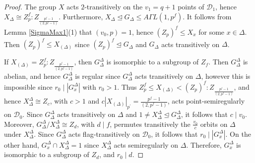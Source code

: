 \documentclass[10pt,a4paper]{amsart}
\renewcommand{\leq}{\leqslant}
\begin{document}
\begin{proof}
The group $X$ acts $2$-transitively on the $v_{1}=q+1$ points of $\mathcal{D}_{1}$, hence $X_{\Delta }\cong Z^{f}_{p}:Z_{\frac{p^{f}-1}{(2,p^{f}-1)}}$. Furthermore, $X_{\Delta }\trianglelefteq G_{\Delta }\leq A\Gamma L(1,p^{f})$. It follows from Lemma \ref{SigmaMax1}(1) that $(v_{0},p)=1$, hence $(Z_{p})^{f}\leq X_{x}$ for some $x\in \Delta $. Then $(Z_{p})^{f}\leq X_{(\Delta )}$ since $(Z_{p})^{f}\trianglelefteq G_{\Delta }$ and $G_{\Delta }$ acts
transitively on $\Delta $.

If $X_{(\Delta )}=Z_{p}^{f}:Z_{\frac{p^{f}-1}{(2,p^{f}-1)}}$, then $%
G_{\Delta }^{\Delta }$ is isomorphic to a subgroup of $Z_{f}$. Then $%
G_{\Delta }^{\Delta }$ is abelian, and hence $G_{\Delta }^{\Delta }$ is
regular since $G_{\Delta }^{\Delta }$ acts transitively on $\Delta $,
however this is impossible since $r_{0}\mid \left\vert G_{x}^{\Delta
}\right\vert $ with $r_{0}>1$. Thus $Z_{p}^{f}\leq X_{(\Delta )}<
(Z_{p})^{f}:Z_{\frac{p^{f}-1}{(2,p^{f}-1)}}$, and hence $X_{\Delta }^{\Delta
}\cong Z_{c}$, with $c>1$ and $c\left\vert X_{(\Delta )}\right\vert _{p^{\prime }}=%
\frac{p^{f}-1}{(2,p^{f}-1)}$, acts point-semiregularly on $%
\mathcal{D}_{0}$. Since $G_{\Delta }^{\Delta }$ acts transitively on $\Delta 
$ and $1\neq X_{\Delta }^{\Delta }\trianglelefteq G_{\Delta }^{\Delta }$, it
follows that $c\mid v_{0}$. Moreover, $G_{\Delta }^{\Delta }/X_{\Delta
}^{\Delta }\cong Z_{d}$, with $d\mid f$, permutes transitively the $\frac{v_{0}%
}{c}$ orbits on $\Delta $ under $X_{\Delta }^{\Delta }$. Since $G_{\Delta
}^{\Delta }$ acts flag-transitively on $\mathcal{D}_{0}$, it follows that $%
r_{0}\mid \left\vert G_{x}^{\Delta }\right\vert $. On the other hand, $%
G_{x}^{\Delta }\cap X_{\Delta }^{\Delta }=1$ since $X_{\Delta }^{\Delta }$
acts semiregularly on $\Delta $. Therefore, $G_{x}^{\Delta }$ is isomorphic
to a subgroup of $Z_{d}$, and $r_{0}\mid d$.


\end{proof}
\end{document}
